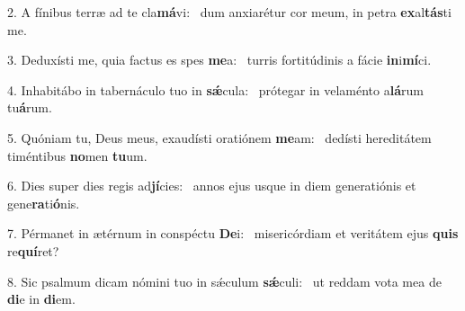 2. A fínibus terræ ad te cla\textbf{má}vi: \ast\  dum anxiarétur cor meum, in petra \textbf{ex}al\textbf{tás}ti me.\

3. Deduxísti me, quia factus es spes \textbf{me}a: \ast\  turris fortitúdinis a fácie \textbf{in}i\textbf{mí}ci.\

4. Inhabitábo in tabernáculo tuo in \textbf{sǽ}cula: \ast\  prótegar in velaménto a\textbf{lá}rum tu\textbf{á}rum.\

5. Quóniam tu, Deus meus, exaudísti oratiónem \textbf{me}am: \ast\  dedísti hereditátem timéntibus \textbf{no}men \textbf{tu}um.\

6. Dies super dies regis ad\textbf{jí}cies: \ast\  annos ejus usque in diem generatiónis et gene\textbf{ra}ti\textbf{ó}nis.\

7. Pérmanet in ætérnum in conspéctu \textbf{De}i: \ast\  misericórdiam et veritátem ejus \textbf{quis} re\textbf{quí}ret?\

8. Sic psalmum dicam nómini tuo in sǽculum \textbf{sǽ}culi: \ast\  ut reddam vota mea de \textbf{di}e in \textbf{di}em.\

